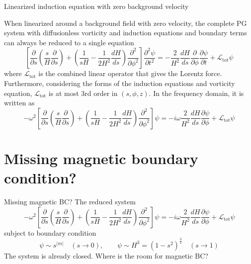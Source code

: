 \documentclass[11pt,aspectratio=169]{beamer}
\begin{document}
\begin{frame}{Linearized induction equation with zero background velocity}
	\begin{corollary}
		When linearized around a background field with zero velocity, the complete PG system with diffusionless vorticity and induction equations and boundary terms can always be reduced to a single equation
		\[
			\left[\frac{\partial}{\partial s}\left(\frac{s}{H}\frac{\partial}{\partial s}\right) + \left(\frac{1}{sH} - \frac{1}{2H^2} \frac{dH}{ds}\right)\frac{\partial^2}{\partial \phi^2}\right] \frac{\partial^2 \psi}{\partial t^2} = - \frac{2}{H^2}\frac{dH}{ds} \frac{\partial}{\partial \phi}\frac{\partial \psi}{\partial t} + \mathcal{L}_\mathrm{tot} \psi
		\]
		where $\mathcal{L}_\mathrm{tot}$ is the combined linear operator that gives the Lorentz force. Furthermore, considering the forms of the induction equations and vorticity equation, $\mathcal{L}_\mathrm{tot}$ is at most 3rd order in $(s,\phi,z)$. In the frequency domain, it is written as
		\[
			-\omega^2\left[\frac{\partial}{\partial s}\left(\frac{s}{H}\frac{\partial}{\partial s}\right) + \left(\frac{1}{sH} - \frac{1}{2H^2} \frac{dH}{ds}\right)\frac{\partial^2}{\partial \phi^2}\right] \psi = -i\omega \frac{2}{H^2}\frac{dH}{ds} \frac{\partial \psi}{\partial \phi} + \mathcal{L}_\mathrm{tot} \psi
		\]
	\end{corollary}
\end{frame}


\section{Missing magnetic boundary condition?}

\begin{frame}{Missing magnetic BC?}
	The reduced system
	\[
		-\omega^2\left[\frac{\partial}{\partial s}\left(\frac{s}{H}\frac{\partial}{\partial s}\right) + \left(\frac{1}{sH} - \frac{1}{2H^2} \frac{dH}{ds}\right)\frac{\partial^2}{\partial \phi^2}\right] \psi = -i\omega \frac{2}{H^2}\frac{dH}{ds} \frac{\partial \psi}{\partial \phi} + \mathcal{L}_\mathrm{tot} \psi
	\]
	subject to boundary condition
	\[
		\psi \sim s^{|m|} \quad (s \rightarrow 0),\qquad \psi \sim H^3 = (1 - s^2)^\frac{3}{2} \quad (s\rightarrow 1)
	\]
	The system is already closed. Where is the room for magnetic BC?
\end{frame}
\end{document}
